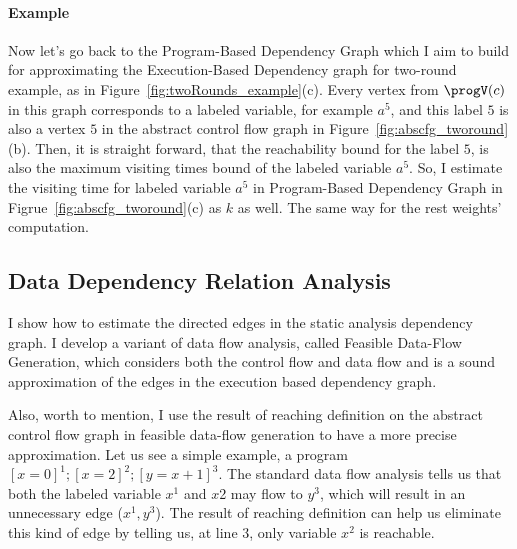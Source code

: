 \paragraph*{Example}
Now let's 
go back to the Program-Based Dependency Graph which I aim to build for approximating the 
Execution-Based Dependency graph for two-round example, as in
Figure~\ref{fig:twoRounds_example}(c).
%
Every vertex from $\progV(c)$ in this graph corresponds to a labeled variable, for example $a^5$,
and this label $5$ is also a vertex $5$ in the abstract control flow graph in Figure~\ref{fig:abscfg_tworound}(b).
%
Then, it is straight forward, 
that the reachability bound for the label $5$, 
is also the maximum visiting times bound of the labeled variable $a^5$.
So, I estimate the visiting time for  labeled variable $a^5$ in Program-Based Dependency Graph in Figrue~\ref{fig:abscfg_tworound}(c) as $k$ as well.
%
The same way for the rest weights' computation.
%
\subsection{Data Dependency Relation Analysis}
\label{sec:alg_edgegen}
   I show how to estimate the directed edges in the static analysis dependency graph.
 I develop a variant of data flow analysis, called Feasible Data-Flow Generation, which 
considers both the control flow and data flow and
is a sound approximation of the edges in the execution based dependency graph.

  Also, worth to mention, I use the result of reaching definition on the abstract control flow graph in feasible 
data-flow generation to have a more precise approximation. Let us see a simple example, a program $ [x = 0]^{1}; [x=2]^{2};  [y = x+1]^{3}$. The standard data flow analysis 
tells us that both the labeled variable $x^{1}$ and $x${2} may flow to $y^{3}$, which will result in an unnecessary edge ($x^{1}, y^{3}$). The result of reaching definition 
can help us eliminate this kind of edge by telling us, at line $3$, only variable $x^{2}$ is reachable. 


